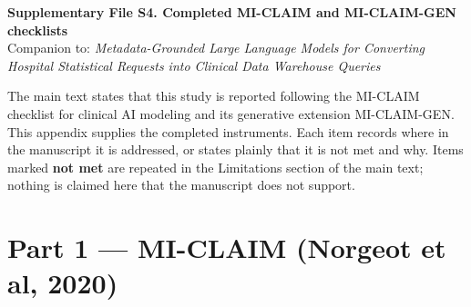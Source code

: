 \documentclass[10pt]{article}
\begin{document}
\begin{center}
{\large\bfseries Supplementary File S4. Completed MI-CLAIM and MI-CLAIM-GEN
checklists}\\[2pt]
{\footnotesize Companion to: \emph{Metadata-Grounded Large Language Models for Converting Hospital Statistical
Requests into Clinical Data Warehouse Queries}}
\end{center}

\vspace{6pt}
\noindent
The main text states that this study is reported following the MI-CLAIM
checklist for clinical AI modeling and its generative extension MI-CLAIM-GEN.
This appendix supplies the completed instruments. Each item records where in the
manuscript it is addressed, or states plainly that it is not met and why.
Items marked \textbf{not met} are repeated in the Limitations section of the main
text; nothing is claimed here that the manuscript does not support.

\section{Part 1 --- MI-CLAIM (Norgeot et al, 2020)}
\end{document}

